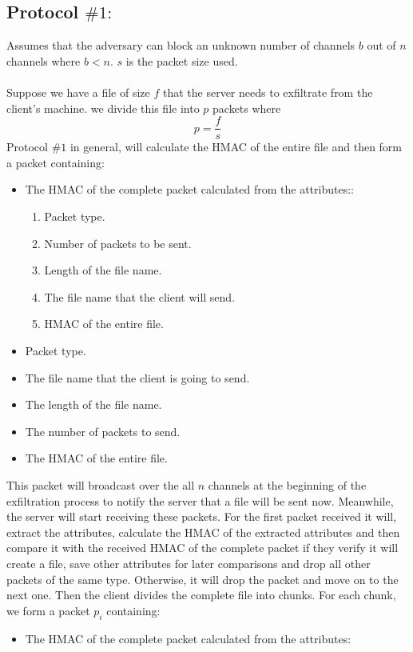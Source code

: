 \documentclass[main.tex]{subfiles}
\begin{document}
\subsection{Protocol $\#1:$}
Assumes that the adversary can block an unknown number of channels $b$ out of $n$ channels where $b < n$. $s$ is the packet size used.
\paragraph{}
Suppose we have a file of size $f$ that the server needs to exfiltrate from the client's machine. we divide this file into $p$ packets where \[p = \frac{f}{s}\] Protocol \#$1$ in general, will calculate the HMAC of the entire file and then form a packet containing: \begin{itemize}
\item The HMAC of the complete packet calculated from the attributes:: 
\begin{enumerate}
\item Packet type.
\item Number of packets to be sent.
\item Length of the file name.
\item The file name that the client will send.
\item HMAC of the entire file.
\end{enumerate}
\item Packet type.
\item The file name that the client is going to send.
\item The length of the file name.
\item The number of packets to send.
\item The HMAC of the entire file.
\end{itemize} This packet will broadcast over the all $n$ channels at the beginning of the exfiltration process to notify the server that a file will be sent now. Meanwhile, the server will start receiving these packets. For the first packet received it will, extract the attributes, calculate the HMAC of the extracted attributes and then compare it with the received HMAC of the complete packet if they verify it will create a file, save other attributes for later comparisons and drop all other packets of the same type. Otherwise, it will drop the packet and move on to the next one. Then the client divides the complete file into chunks. For each chunk, we form a packet $p_{i}$ containing:\begin{itemize}
\item The HMAC of the complete packet calculated from the attributes:

\end{itemize}
\end{document}
